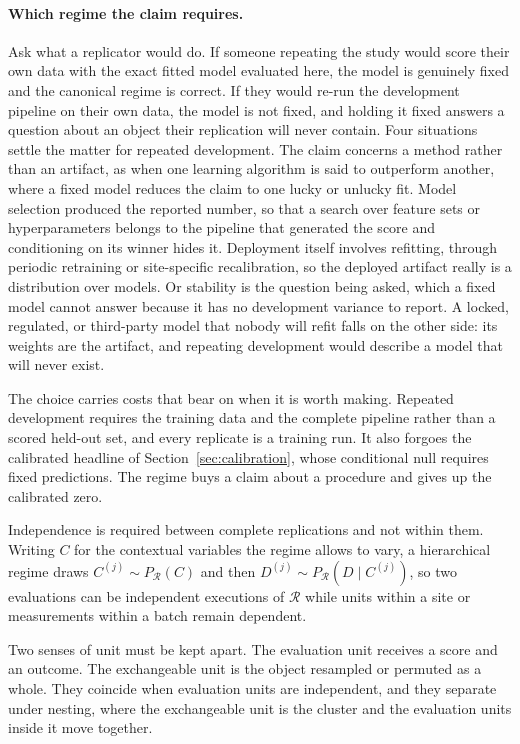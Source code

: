 \documentclass[11pt]{article}
\newcommand{\Regime}{\mathcal{R}}
\theoremstyle{remark}
\begin{document}
\paragraph{Which regime the claim requires.}
Ask what a replicator would do. If someone repeating the study would score their own data with the exact fitted model evaluated here, the model is genuinely fixed and the canonical regime is correct. If they would re-run the development pipeline on their own data, the model is not fixed, and holding it fixed answers a question about an object their replication will never contain. Four situations settle the matter for repeated development. The claim concerns a method rather than an artifact, as when one learning algorithm is said to outperform another, where a fixed model reduces the claim to one lucky or unlucky fit. Model selection produced the reported number, so that a search over feature sets or hyperparameters belongs to the pipeline that generated the score and conditioning on its winner hides it. Deployment itself involves refitting, through periodic retraining or site-specific recalibration, so the deployed artifact really is a distribution over models. Or stability is the question being asked, which a fixed model cannot answer because it has no development variance to report. A locked, regulated, or third-party model that nobody will refit falls on the other side: its weights are the artifact, and repeating development would describe a model that will never exist.

The choice carries costs that bear on when it is worth making. Repeated development requires the training data and the complete pipeline rather than a scored held-out set, and every replicate is a training run. It also forgoes the calibrated headline of Section~\ref{sec:calibration}, whose conditional null requires fixed predictions. The regime buys a claim about a procedure and gives up the calibrated zero.

Independence is required between complete replications and not within them. Writing $C$ for the contextual variables the regime allows to vary, a hierarchical regime draws $C^{(j)}\sim P_{\Regime}(C)$ and then $D^{(j)}\sim P_{\Regime}(D\mid C^{(j)})$, so two evaluations can be independent executions of $\Regime$ while units within a site or measurements within a batch remain dependent.

Two senses of unit must be kept apart. The evaluation unit receives a score and an outcome. The exchangeable unit is the object resampled or permuted as a whole. They coincide when evaluation units are independent, and they separate under nesting, where the exchangeable unit is the cluster and the evaluation units inside it move together.
\end{document}
